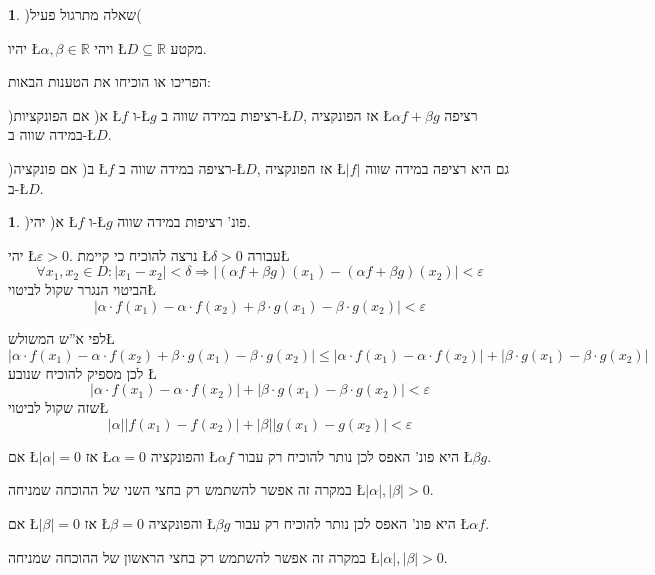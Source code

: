 \documentclass[english,hebrew]{article}
\theoremstyle{plain}
\theoremstyle{definition}
\newtheorem{xca}[thm]{\protect\exercisename}
\theoremstyle{definition}
\newtheorem*{sol*}{\protect\solutionname}
\providecommand{\exercisename}{תרגיל}
\providecommand{\solutionname}{פתרון}
\begin{document}
\begin{xca}
)שאלה מתרגול פעיל(

יהיו \L{$\alpha,\beta\in\mathbb{R}$} ויהי \L{$D\subseteq\mathbb{R}$}
מקטע.

הפריכו או הוכיחו את הטענות הבאות:

)א( אם הפונקציות \L{$f$} ו-\L{$g$} רציפות במידה שווה ב-\L{$D$},
אז הפונקציה \L{$\alpha f+\beta g$} רציפה במידה שווה ב-\L{$D$}.

)ב( אם פונקציה \L{$f$} רציפה במידה שווה ב-\L{$D$}, אז הפונקציה \L{$|f|$}
גם היא רציפה במידה שווה ב-\L{$D$}. 
\end{xca}

\begin{sol*}
)א( יהי \L{$f$} ו-\L{$g$} פונ' רציפות במידה שווה. 

יהי \L{$\varepsilon>0$}. נרצה להוכיח כי קיימת \L{$\delta>0$} עבורה\L{%
\[
\forall x_{1},x_{2}\in D:\left|x_{1}-x_{2}\right|<\delta\Rightarrow\left|\left(\alpha f+\beta g\right)\left(x_{1}\right)-\left(\alpha f+\beta g\right)\left(x_{2}\right)\right|<\varepsilon
\]
}%
הביטוי הנגרר שקול לביטוי\L{%
\[
\left|\alpha\cdot f\left(x_{1}\right)-\alpha\cdot f\left(x_{2}\right)+\beta\cdot g\left(x_{1}\right)-\beta\cdot g\left(x_{2}\right)\right|<\varepsilon
\]
}%

לפי א\textquotedblright ש המשולש\L{%
\[
\left|\alpha\cdot f\left(x_{1}\right)-\alpha\cdot f\left(x_{2}\right)+\beta\cdot g\left(x_{1}\right)-\beta\cdot g\left(x_{2}\right)\right|\le\left|\alpha\cdot f\left(x_{1}\right)-\alpha\cdot f\left(x_{2}\right)\right|+\left|\beta\cdot g\left(x_{1}\right)-\beta\cdot g\left(x_{2}\right)\right|
\]
}%
לכן מספיק להוכיח שנובע \L{%
\[
\left|\alpha\cdot f\left(x_{1}\right)-\alpha\cdot f\left(x_{2}\right)\right|+\left|\beta\cdot g\left(x_{1}\right)-\beta\cdot g\left(x_{2}\right)\right|<\varepsilon
\]
}%
שזה שקול לביטוי\L{%
\[
\left|\alpha\right|\left|f\left(x_{1}\right)-f\left(x_{2}\right)\right|+\left|\beta\right|\left|g\left(x_{1}\right)-g\left(x_{2}\right)\right|<\varepsilon
\]
}%

אם \L{$\left|\alpha\right|=0$} אז \L{$\alpha=0$} והפונקציה \L{$\alpha f$}
היא פונ' האפס לכן נותר להוכיח רק עבור \L{$\beta g$}.

במקרה זה אפשר להשתמש רק בחצי השני של ההוכחה שמניחה \L{$\left|\alpha\right|,\left|\beta\right|>0$}.

אם \L{$\left|\beta\right|=0$} אז \L{$\beta=0$} והפונקציה \L{$\beta g$}
היא פונ' האפס לכן נותר להוכיח רק עבור \L{$\alpha f$}.

במקרה זה אפשר להשתמש רק בחצי הראשון של ההוכחה שמניחה \L{$\left|\alpha\right|,\left|\beta\right|>0$}.


\end{sol*}
\end{document}
